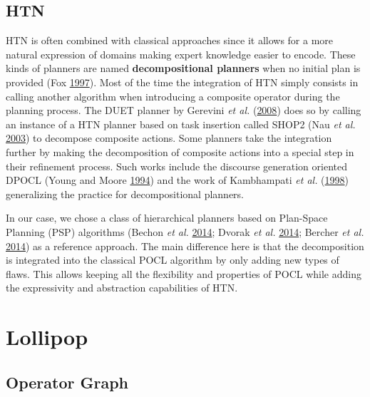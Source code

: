 \documentclass[11pt,a4paper,twoside,openright,titlepage,numbers=noenddot,headinclude,cleardoublepage=empty,openany]{scrreprt}
\theoremstyle{plain}
\theoremstyle{definition}
\theoremstyle{remark}
\begin{document}
\hypertarget{htn}{%
\subsection{HTN}\label{htn}}

HTN is often combined with classical approaches since it allows for a
more natural expression of domains making expert knowledge easier to
encode. These kinds of planners are named \textbf{decompositional
planners} when no initial plan is provided (Fox
\protect\hyperlink{ref-fox_natural_1997}{1997}). Most of the time the
integration of HTN simply consists in calling another algorithm when
introducing a composite operator during the planning process. The DUET
planner by Gerevini \emph{et al.}
(\protect\hyperlink{ref-gerevini_combining_2008}{2008}) does so by
calling an instance of a HTN planner based on task insertion called
SHOP2 (Nau \emph{et al.} \protect\hyperlink{ref-nau_shop2_2003}{2003})
to decompose composite actions. Some planners take the integration
further by making the decomposition of composite actions into a special
step in their refinement process. Such works include the discourse
generation oriented DPOCL (Young and Moore
\protect\hyperlink{ref-young_dpocl_1994}{1994}) and the work of
Kambhampati \emph{et al.}
(\protect\hyperlink{ref-kambhampati_hybrid_1998}{1998}) generalizing the
practice for decompositional planners.

In our case, we chose a class of hierarchical planners based on
Plan-Space Planning (PSP) algorithms (Bechon \emph{et al.}
\protect\hyperlink{ref-bechon_hipop_2014}{2014}; Dvorak \emph{et al.}
\protect\hyperlink{ref-dvorak_flexible_2014}{2014}; Bercher \emph{et
al.} \protect\hyperlink{ref-bercher_hybrid_2014}{2014}) as a reference
approach. The main difference here is that the decomposition is
integrated into the classical POCL algorithm by only adding new types of
flaws. This allows keeping all the flexibility and properties of POCL
while adding the expressivity and abstraction capabilities of HTN.

\hypertarget{lollipop}{%
\section{Lollipop}\label{lollipop}}

\hypertarget{operator-graph}{%
\subsection{Operator Graph}\label{operator-graph}}
\end{document}
